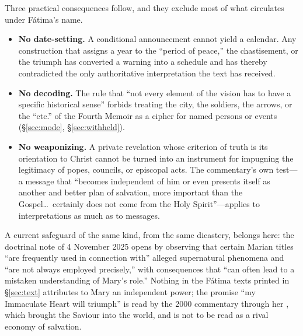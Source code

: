 Three practical consequences follow, and they exclude most of what
circulates under F\'atima's name.

\begin{itemize}
\item \textbf{No date-setting.} A conditional announcement cannot
yield a calendar. Any construction that assigns a year to the
``period of peace,'' the chastisement, or the triumph has converted a
warning into a schedule and has thereby contradicted the only
authoritative interpretation the text has received.
\item \textbf{No decoding.} The rule that ``not every element of the
vision has to have a specific historical sense'' forbids treating the
city, the soldiers, the arrows, or the ``etc.'' of the Fourth Memoir
as a cipher for named persons or events (\S\ref{sec:mode},
\S\ref{sec:withheld}).
\item \textbf{No weaponizing.} A private revelation whose criterion
of truth is its orientation to Christ cannot be turned into an
instrument for impugning the legitimacy of popes, councils, or
episcopal acts. The commentary's own test---a message that ``becomes
independent of him or even presents itself as another and better plan
of salvation, more important than the Gospel\ldots\ certainly does
not come from the Holy Spirit''---applies to interpretations as much
as to messages.
\end{itemize}

A current safeguard of the same kind, from the same dicastery,
belongs here: the doctrinal note  of
4 November 2025 opens by observing that certain Marian titles ``are
frequently used in connection with'' alleged supernatural phenomena
and ``are not always employed precisely,'' with consequences that
``can often lead to a mistaken understanding of Mary's role.''
Nothing in the F\'atima texts printed in \S\ref{sec:text} attributes
to Mary an independent power; the promise ``my Immaculate Heart will
triumph'' is read by the 2000 commentary through her ,
which brought the Saviour into the world, and is not to be read as a
rival economy of salvation.

